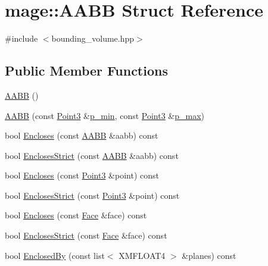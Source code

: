 \hypertarget{structmage_1_1_a_a_b_b}{}\section{mage\+:\+:A\+A\+BB Struct Reference}
\label{structmage_1_1_a_a_b_b}


{\ttfamily \#include $<$bounding\+\_\+volume.\+hpp$>$}

\subsection*{Public Member Functions}
\begin{DoxyCompactItemize}
\item 
\hyperlink{structmage_1_1_a_a_b_b_ae6db94dcb9165eb008f0be8741f0eb62}{A\+A\+BB} ()
\item 
\hyperlink{structmage_1_1_a_a_b_b_aff9e36907c435c74cc948a13cc9f1222}{A\+A\+BB} (const \hyperlink{structmage_1_1_point3}{Point3} \&\hyperlink{structmage_1_1_a_a_b_b_a600c62081fd3516c0be64bb81495cd1d}{p\+\_\+min}, const \hyperlink{structmage_1_1_point3}{Point3} \&\hyperlink{structmage_1_1_a_a_b_b_ad0a69206176c61ce9a71f2ddb0e5deb2}{p\+\_\+max})
\item 
bool \hyperlink{structmage_1_1_a_a_b_b_a0d6619404376bacf956b4a0c6662696f}{Encloses} (const \hyperlink{structmage_1_1_a_a_b_b}{A\+A\+BB} \&aabb) const
\item 
bool \hyperlink{structmage_1_1_a_a_b_b_a3bb59de6eca634cb3ddec4ad314fde21}{Encloses\+Strict} (const \hyperlink{structmage_1_1_a_a_b_b}{A\+A\+BB} \&aabb) const
\item 
bool \hyperlink{structmage_1_1_a_a_b_b_a67d1820b5ee787f02e6cfd593aca35fd}{Encloses} (const \hyperlink{structmage_1_1_point3}{Point3} \&point) const
\item 
bool \hyperlink{structmage_1_1_a_a_b_b_a436950a97b647179506bb42a3f2f2b34}{Encloses\+Strict} (const \hyperlink{structmage_1_1_point3}{Point3} \&point) const
\item 
bool \hyperlink{structmage_1_1_a_a_b_b_ab57318f2ea79779ed357a7ecdd101132}{Encloses} (const \hyperlink{structmage_1_1_face}{Face} \&face) const
\item 
bool \hyperlink{structmage_1_1_a_a_b_b_acc5a6584d01c80abf5a59405b21e1a2c}{Encloses\+Strict} (const \hyperlink{structmage_1_1_face}{Face} \&face) const
\item 
bool \hyperlink{structmage_1_1_a_a_b_b_a7d4cd9138aa14aa79fba35a266634dac}{Enclosed\+By} (const list$<$ X\+M\+F\+L\+O\+A\+T4 $>$ \&planes) const

\end{DoxyCompactItemize}

